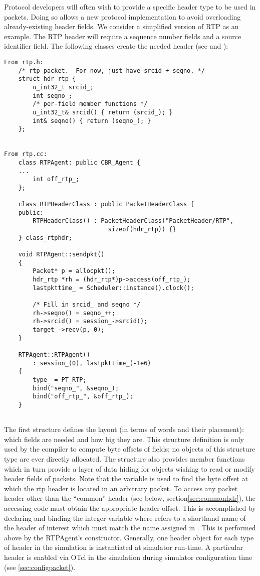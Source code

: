 Protocol developers
will often wish to provide a specific header type to be used in packets.
Doing so allows a new protocol implementation
to avoid overloading already-existing header fields.
We consider a simplified version of RTP as an example.
The RTP header will require a sequence number fields and a source
identifier field.
The following classes create the needed header
(see  and ):
\begin{small}
\begin{verbatim}
From rtp.h:
	/* rtp packet.  For now, just have srcid + seqno. */
	struct hdr_rtp { 
		u_int32_t srcid_;
		int seqno_;
		/* per-field member functions */
		u_int32_t& srcid() { return (srcid_); }
		int& seqno() { return (seqno_); }
	};   


From rtp.cc:
	class RTPAgent: public CBR_Agent {
	...
		int off_rtp_;
	};

	class RTPHeaderClass : public PacketHeaderClass {
	public: 
		RTPHeaderClass() : PacketHeaderClass("PacketHeader/RTP",
						     sizeof(hdr_rtp)) {}
	} class_rtphdr;

	void RTPAgent::sendpkt()
	{
		Packet* p = allocpkt();
		hdr_rtp *rh = (hdr_rtp*)p->access(off_rtp_);
		lastpkttime_ = Scheduler::instance().clock();

		/* Fill in srcid_ and seqno */
		rh->seqno() = seqno_++;
		rh->srcid() = session_->srcid();
		target_->recv(p, 0);
	}

	RTPAgent::RTPAgent()
		: session_(0), lastpkttime_(-1e6)
	{
		type_ = PT_RTP;
		bind("seqno_", &seqno_);
		bind("off_rtp_", &off_rtp_);
	}


\end{verbatim}
\end{small}
The first structure defines the layout (in terms of words and their
placement): which fields are needed and how big they are.
This structure definition is only used by the
compiler to compute byte offsets of fields;
no objects of this structure type are ever directly allocated.
The structure also provides member functions
which in turn
provide a layer of data hiding for objects wishing to read
or modify header fields of packets.
Note that the variable  is used
to find the byte offset at which the rtp header is located
in an arbitrary packet.
To access any packet header other than the ``common'' header
(see below, section\ref{sec:commonhdr}), the accessing code
must obtain the appropriate header offset.
This is accomplished by declaring and binding
the integer variable 
where  refers to a shorthand name
of the header of interest which must match the
name assigned in .
This is performed above by the RTPAgent's constructor.
Generally, one header object for each type of header
in the simulation is instantiated at simulator run-time.
A particular header is enabled via OTcl in the simulation during
simulator configuration time (see \ref{sec:configpacket}).

